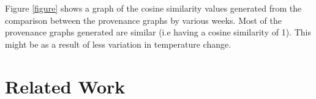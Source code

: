 Figure \ref{figure} shows a graph of the cosine similarity values generated from the comparison between the provenance graphs by various weeks. Most of the provenance graphs generated are similar (i.e having a cosine similarity of 1). This might be as a result of less variation in temperature change. 




%




%




\section{Related Work}

